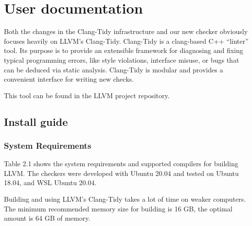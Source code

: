 \chapter{User documentation}
\label{ch:user}

Both the changes in the Clang-Tidy infrastructure and our new checker obviously focuses heavily on LLVM's Clang-Tidy.
Clang-Tidy is a clang-based C++ “linter” tool. Its purpose is to provide an extensible framework for diagnosing and fixing
typical programming errors, like style violations, interface misuse, or bugs that can be deduced via static analysis.
Clang-Tidy is modular and provides a convenient interface for writing new checks. %

This tool can be found in the LLVM project repository. %

\section{Install guide}

\subsection{System Requirements}

Table 2.1 shows the system requirements and supported compilers for building
LLVM. The checkers were developed with Ubuntu 20.04 and tested on Ubuntu 18.04, and WSL Ubuntu 20.04.

Building and using LLVM's Clang-Tidy takes a lot of time on weaker computers. The minimum recommended memory size
for building is 16 GB, the optimal amount is 64 GB of memory. %

